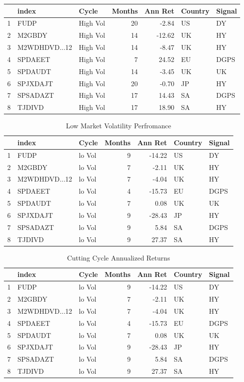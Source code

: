 \documentclass[11pt,preprint, authoryear]{elsarticle}
\numberwithin{equation}{section}
\numberwithin{figure}{section}
\numberwithin{table}{section}
\begin{document}
\begin{tabular}{rllrrll}
  \hline
 & index & Cycle & Months & Ann Ret & Country & Signal \\ 
  \hline
1 & FUDP & High Vol &  20 & -2.84 & US & DY \\ 
  2 & M2GBDY & High Vol &  14 & -12.62 & UK & HY \\ 
  3 & M2WDHDVD...12 & High Vol &  14 & -8.47 & UK & HY \\ 
  4 & SPDAEET & High Vol &   7 & 24.52 & EU & DGPS \\ 
  5 & SPDAUDT & High Vol &  14 & -3.45 & UK & UK \\ 
  6 & SPJXDAJT & High Vol &  20 & -0.70 & JP & HY \\ 
  7 & SPSADAZT & High Vol &  17 & 14.43 & SA & DGPS \\ 
  8 & TJDIVD & High Vol &  17 & 18.90 & SA & HY \\ 
   \hline
\end{tabular}
\begin{longtable}{rllrrll}
\caption{Low Market Volatility Perfromance \label{tab2}} \\ 
  \hline
 & index & Cycle & Months & Ann Ret & Country & Signal \\ 
  \hline
1 & FUDP & lo Vol &   9 & -14.22 & US & DY \\ 
  2 & M2GBDY & lo Vol &   7 & -2.11 & UK & HY \\ 
  3 & M2WDHDVD...12 & lo Vol &   7 & -4.04 & UK & HY \\ 
  4 & SPDAEET & lo Vol &   4 & -15.73 & EU & DGPS \\ 
  5 & SPDAUDT & lo Vol &   7 & 0.08 & UK & UK \\ 
  6 & SPJXDAJT & lo Vol &   9 & -28.43 & JP & HY \\ 
  7 & SPSADAZT & lo Vol &   9 & 5.84 & SA & DGPS \\ 
  8 & TJDIVD & lo Vol &   9 & 27.37 & SA & HY \\ 
   \hline
\hline
\end{longtable}
\begin{longtable}{rllrrll}
\caption{Cutting Cycle Annualized Returns  \label{tab1}} \\ 
  \hline
 & index & Cycle & Months & Ann Ret & Country & Signal \\ 
  \hline
1 & FUDP & lo Vol &   9 & -14.22 & US & DY \\ 
  2 & M2GBDY & lo Vol &   7 & -2.11 & UK & HY \\ 
  3 & M2WDHDVD...12 & lo Vol &   7 & -4.04 & UK & HY \\ 
  4 & SPDAEET & lo Vol &   4 & -15.73 & EU & DGPS \\ 
  5 & SPDAUDT & lo Vol &   7 & 0.08 & UK & UK \\ 
  6 & SPJXDAJT & lo Vol &   9 & -28.43 & JP & HY \\ 
  7 & SPSADAZT & lo Vol &   9 & 5.84 & SA & DGPS \\ 
  8 & TJDIVD & lo Vol &   9 & 27.37 & SA & HY \\ 
   \hline
\hline
\end{longtable}
\end{document}
